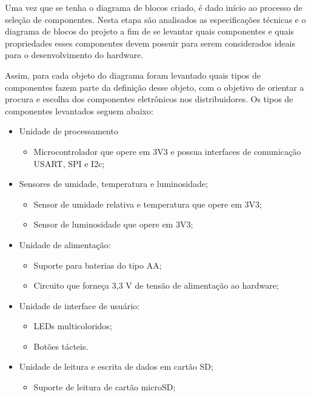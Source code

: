Uma vez que se tenha o diagrama de blocos criado, é dado início ao processo de seleção de componentes. Nesta etapa são analisados as especificações técnicas e o diagrama de blocos do projeto a fim de se levantar quais componentes e quais propriedades esses componentes devem possuir para serem considerados ideais para o desenvolvimento do hardware. 

Assim, para cada objeto do diagrama foram levantado quais tipos de componentes fazem parte da definição desse objeto, com o objetivo de orientar a procura e escolha dos componentes eletrônicos nos distribuidores. Os tipos de componentes levantados seguem abaixo: 

\begin{itemize}
 
 \item Unidade de processamento
     \begin{itemize}
         \item Microcontrolador que opere em 3V3 e possua interfaces de comunicação USART, SPI e I2c;
     \end{itemize}

 \item Sensores de umidade, temperatura e luminosidade; 
  \begin{itemize}
     \item Sensor de umidade relativa e temperatura que opere em 3V3;
     \item Sensor de luminosidade que opere em 3V3;
 \end{itemize}
 
 \item Unidade de alimentação:
     \begin{itemize}
         \item Suporte para baterias do tipo AA;
         \item Circuito que forneça 3,3 V de tensão de alimentação ao hardware;
    \end{itemize} 

\item Unidade de interface de usuário: 

    \begin{itemize}
        \item LEDs multicoloridos;
        \item Botões tácteis.
    \end{itemize}
 
 \item Unidade de leitura e escrita de dados em cartão SD;
     \begin{itemize}
         \item Suporte de leitura de cartão microSD;
     \end{itemize}
\end{itemize}

